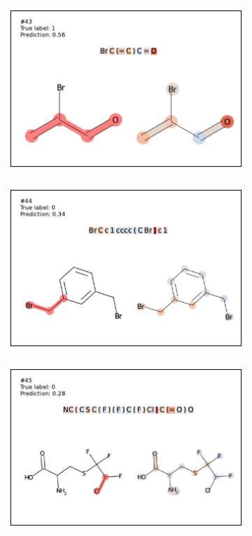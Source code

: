 \begin{figure}
\begin{subfigure}[b]{0.33\textwidth}
\end{subfigure}\begin{subfigure}[b]{0.33\textwidth} 
  \centering 
  \includegraphics[width=\textwidth]{figures/ames/ames43.pdf} 
\end{subfigure} 
\begin{subfigure}[b]{0.33\textwidth} 
  \centering 
  \includegraphics[width=\textwidth]{figures/ames/ames44.pdf} 
\end{subfigure}\begin{subfigure}[b]{0.33\textwidth} 
  \centering 
  \includegraphics[width=\textwidth]{figures/ames/ames45.pdf} 

\end{subfigure}
\end{figure}
